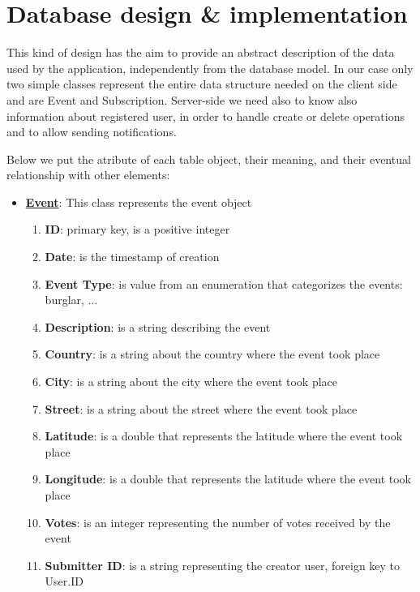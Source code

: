 \documentclass[a4paper]{scrreprt}
\begin{document}
\section{Database design \& implementation}
This kind of design has the aim to provide an abstract description of the data used by the application, independently from the database model. In our case only two simple classes represent the entire data structure needed on the client side and are Event and Subscription. Server-side we need also to know also information about registered user, in order to handle create or delete operations and to allow sending notifications.
\par Below we put the atribute of each table object, their meaning, and their eventual relationship with other elements:
\begin{itemize}
\item \underline{\textbf{Event}}: This class represents the event object
\begin{enumerate}
\item \textbf{ID}: primary key, is a positive integer
\item \textbf{Date}: is the timestamp of creation
\item \textbf{Event Type}: is value from an enumeration that categorizes the events: burglar, ...
\item \textbf{Description}: is a string describing the event
\item \textbf{Country}: is a string about the country where the event took place
\item \textbf{City}: is a string about the city where the event took place
\item \textbf{Street}: is a string about the street where the event took place
\item \textbf{Latitude}: is a double that represents the latitude where the event took place
\item \textbf{Longitude}:  is a double that represents the latitude where the event took place
\item \textbf{Votes}: is an integer representing the number of votes received by the event
\item \textbf{Submitter ID}: is a string representing the creator user, foreign key to User.ID

\end{enumerate}


\end{itemize}
\end{document}
